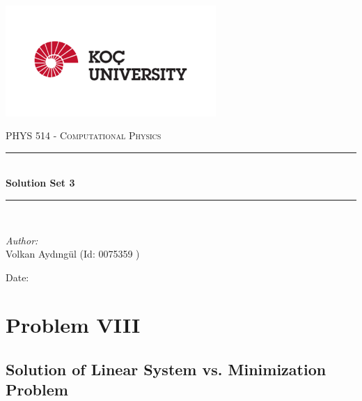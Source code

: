 \documentclass[letterpaper,12pt]{article}
\newcommand{\reporttitle}{Solution Set 3}
\newcommand{\reportauthor}{ Volkan Aydıngül (Id: 0075359 )\\
                            }
\begin{document}
\begin{titlepage}
\newcommand{\HRule}{\rule{\linewidth}{0.5mm}}
\begin{center} %
\includegraphics[width = 8cm]{figures/koc_logo.png}

\textsc{\Large PHYS 514 - Computational Physics}\\[1.5cm] 
\HRule \\[0.6cm]
{ \huge \bfseries \reporttitle}\\ %
\HRule \\[1.5cm]
\end{center}
\vspace{2cm}
\begin{flushleft} \large
\textit{Author:}\\
\reportauthor%
\end{flushleft}
\vspace{2cm}
\makeatletter
Date: \@date 
\vfill %
\makeatother
\end{titlepage}




\tableofcontents
\newpage






\section{Problem VIII}
\subsection{Solution of Linear System vs. Minimization Problem}
\end{document}
